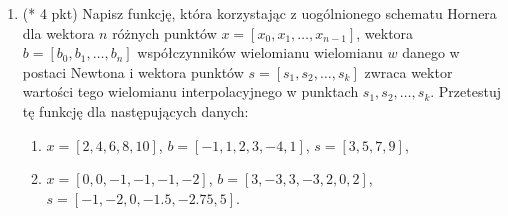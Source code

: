 \documentclass[10pt,a4paper]{article}
\begin{document}
\begin{enumerate}
\item (* 4 pkt) Napisz funkcję, która korzystając z uogólnionego schematu Hornera dla wektora $n$ różnych punktów $x=[x_0,x_1,\ldots,x_{n-1}]$, wektora $b=[b_0,b_1,\ldots,b_n]$  współczynników wielomianu wielomianu $w$ danego w postaci Newtona i wektora punktów $s=[s_1,s_2,\ldots,s_k]$ zwraca wektor wartości tego wielomianu interpolacyjnego w punktach $s_1,s_2,\ldots,s_k$. Przetestuj tę funkcję dla następujących danych:
\begin{enumerate}
	\item $x=[2,4,6,8,10]$, $b=[-1,1,2,3,-4,1]$, $s=[3,5,7,9]$,
	\item $x=[0,0,-1,-1,-1,-2]$, $b=[3,-3,3,-3,2,0,2]$, $s=[-1,-2,0,-1.5,-2.75,5]$.
\end{enumerate}



\end{enumerate}
\end{document}
